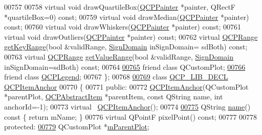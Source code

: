 \begin{DoxyCode}
00757   
00758   \textcolor{keyword}{virtual} \textcolor{keywordtype}{void} drawQuartileBox(\hyperlink{a00047}{QCPPainter} *painter, QRectF *quartileBox=0) \textcolor{keyword}{const};
00759   \textcolor{keyword}{virtual} \textcolor{keywordtype}{void} drawMedian(\hyperlink{a00047}{QCPPainter} *painter) \textcolor{keyword}{const};
00760   \textcolor{keyword}{virtual} \textcolor{keywordtype}{void} drawWhiskers(\hyperlink{a00047}{QCPPainter} *painter) \textcolor{keyword}{const};
00761   \textcolor{keyword}{virtual} \textcolor{keywordtype}{void} drawOutliers(\hyperlink{a00047}{QCPPainter} *painter) \textcolor{keyword}{const};
00762   \textcolor{keyword}{virtual} \hyperlink{a00049}{QCPRange} \hyperlink{a00024_a7aa24ed0b3c39bd99338c7b9f145a71b}{getKeyRange}(\textcolor{keywordtype}{bool} &validRange, \hyperlink{a00024_a661743478a1d3c09d28ec2711d7653d8}{SignDomain} inSignDomain=
      sdBoth) \textcolor{keyword}{const};
00763   \textcolor{keyword}{virtual} \hyperlink{a00049}{QCPRange} \hyperlink{a00024_aed35cfebe5546feea7af2638dd869d5f}{getValueRange}(\textcolor{keywordtype}{bool} &validRange, 
      \hyperlink{a00024_a661743478a1d3c09d28ec2711d7653d8}{SignDomain} inSignDomain=sdBoth) \textcolor{keyword}{const};
00764   
\hypertarget{a00116_source_l00765}{}\hyperlink{a00050_a1cdf9df76adcfae45261690aa0ca2198}{00765}   \textcolor{keyword}{friend} \textcolor{keyword}{class }QCustomPlot;
\hypertarget{a00116_source_l00766}{}\hyperlink{a00050_a8429035e7adfbd7f05805a6530ad5e3b}{00766}   \textcolor{keyword}{friend} \textcolor{keyword}{class }\hyperlink{a00045}{QCPLegend};
00767 \};
00768 
\hypertarget{a00116_source_l00769}{}\hyperlink{a00032}{00769} \textcolor{keyword}{class }\hyperlink{a00116_a5eaab02224a642ded7fb8951e973a02c}{QCP\_LIB\_DECL} \hyperlink{a00032}{QCPItemAnchor}
00770 \{
00771 \textcolor{keyword}{public}:
00772   \hyperlink{a00032}{QCPItemAnchor}(QCustomPlot *parentPlot, \hyperlink{a00022}{QCPAbstractItem} *parentItem, \textcolor{keyword}{const} 
      QString name, \textcolor{keywordtype}{int} anchorId=-1);
00773   \textcolor{keyword}{virtual} ~\hyperlink{a00032}{QCPItemAnchor}();
00774   
\hypertarget{a00116_source_l00775}{}\hyperlink{a00032_ac93984042a58c875e76847dc3e5f75fe}{00775}   QString \hyperlink{a00032_ac93984042a58c875e76847dc3e5f75fe}{name}()\textcolor{keyword}{ const }\{ \textcolor{keywordflow}{return} mName; \}
00776   \textcolor{keyword}{virtual} QPointF pixelPoint() \textcolor{keyword}{const};
00777   
00778 \textcolor{keyword}{protected}:
\hypertarget{a00116_source_l00779}{}\hyperlink{a00032_a59b968410831ba91a25cc75a77dde6f5}{00779}   QCustomPlot *\hyperlink{a00032_a59b968410831ba91a25cc75a77dde6f5}{mParentPlot};

\end{DoxyCode}
